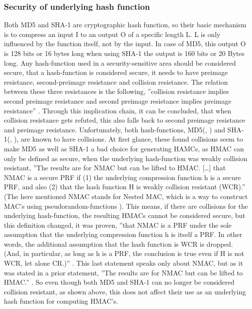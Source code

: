 \subsubsection{Security of underlying hash function}
Both MD5 and SHA-1 are cryptographic hash function, so their basic mechanism is to compress an input I to an output O of a specific length L. L is only influenced by the function itself, not by the input. In case of MD5, this output O is 128 bits or 16 bytes \cite{BAV} long when using SHA-1 the output is 160 bits or 20 Bytes \cite{BAV} long. Any hash-function used in a security-sensitive area should be considered secure, that a hash-function is considered secure, it needs to have preimage resistance, second-preimage resistance and collision resistance. The relation between these three resistances is the following, ''collision resistance implies second preimage resistance and second preimage resistance implies preimage resistance'' \cite{SPR-res}. Through this implication chain, it can be concluded, that when collision resistance gets refuted, this also falls back to second preimage resistance and preimage resistance. Unfortunately, both hash-functions, MD5(\cite{COL1}, \cite{COL2}) and SHA-1(\cite{COL3}, \cite{COL4}), are known to have collisions. At first glance, these found collisions seem to make MD5 as well as SHA-1 a bad choice for generating HAMCs, as HMAC can only be defined as secure, when the underlying hash-function was weakly collision resistant, ''The results are for NMAC but can be lifted to HMAC.
[\dots] that NMAC is a secure PRF if (1) the underlying compression function h is a secure PRF, and also (2) that the hash function H is weakly collision resistant (WCR).'' \cite{HMAC-SEC1}(The here mentioned NMAC stands for Nested MAC, which is a way to construct MAC's using pseudorandom-functions \cite{NMAC}). This means, if there are collisions for the underlying hash-function, the resulting HMACs cannot be considered secure, but this definition changed, it was proven, ''that NMAC is a PRF under the sole assumption that the underlying compression function h is itself a PRF. In other words, the additional assumption that the hash function is WCR is dropped. (And, in particular, as long as h is a PRF, the conclusion is true even if H is not WCR, let alone CR.)'' \cite{HMAC-SEC1}. This last statement speaks only about NMAC, but as it was stated in a prior statement, ''The results are for NMAC but can be lifted to HMAC.'' \cite{HMAC-SEC1}. So even though both MD5 and SHA-1 can no longer be considered collision resistant, as shown above, this does not affect their use as an underlying hash function for computing HMAC's.
